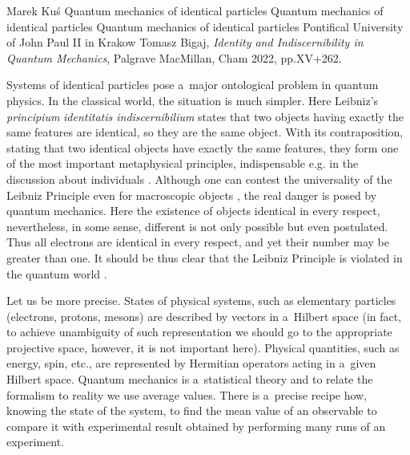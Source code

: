 \begin{newrevengenv}{Marek Kuś}
	{Quantum mechanics of identical particles}
	{Quantum mechanics of identical particles}
	{Quantum mechanics of identical particles}
	{Pontifical University of John Paul II in Krakow}
	{Tomasz Bigaj, \textit{Identity and Indiscernibility in Quantum Mechanics}, Palgrave MacMillan, Cham 2022, pp.XV+262.}





\lettrine[loversize=0.13,lines=2,lraise=-0.01,nindent=0em,findent=0.2pt]%
{S}{}ystems of identical particles pose a~major ontological problem in quantum physics. In the classical world, the situation is much simpler. Here Leibniz's \textit{principium} \textit{identitatis indiscernibilium} states that two objects having exactly the same features are identical, so they are the same object. With its contraposition, stating that two identical objects have exactly the same features, they form one of the most important metaphysical principles, indispensable e.g. in the discussion about individuals
\parencite[][]{guay_individuals_2016}. %
 Although one can contest the universality of the Leibniz Principle even for macroscopic objects 
\parencite[][]{black_identity_1952}, %
 the real danger is posed by quantum mechanics. Here the existence of objects identical in every respect, nevertheless, in some sense, different is not only possible but even postulated. Thus all electrons are identical in every respect, and yet their number may be greater than one. It should be thus clear that the Leibniz Principle is violated in the quantum world 
\parencites[][]{cortes_leibnizs_1976}[][]{ginsberg_quantum_1981}[][]{french_quantum_1988}[][]{castellani_leibnizs_2000}.%


Let us be more precise. States of physical systems, such as elementary particles (electrons, protons, mesons) are described by vectors in a~Hilbert space (in fact, to achieve unambiguity of such representation we should go to the appropriate projective space, however, it is not important here). Physical quantities, such as energy, spin, etc., are represented by Hermitian operators acting in a~given Hilbert space. Quantum mechanics is a~statistical theory and to relate the formalism to reality we use average values. There is a~precise recipe how, knowing the state of the system, to find the mean value of an observable to compare it with experimental result obtained by performing many runs of an experiment.


\end{newrevengenv}
